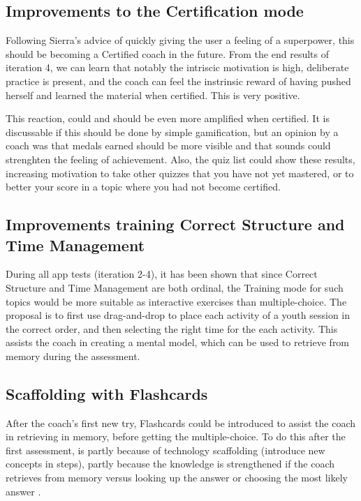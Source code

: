 \subsection{Improvements to the Certification mode}

Following Sierra's advice of quickly giving the user a feeling of a superpower, this should be becoming a Certified coach in the future. From the end results of iteration 4, we can learn that notably the intriscic motivation is high, deliberate practice is present, and the coach can feel the instrinsic reward of having pushed herself and learned the material when certified. This is very positive.

This reaction, could and should be even more amplified when certified. It is discussable if this should be done by simple gamification, but an opinion by a coach was that medals earned should be more visible and that sounds could strenghten the feeling of achievement. Also, the quiz list could show these results, increasing motivation to take other quizzes that you have not yet mastered, or to better your score in a topic where you had not become certified.

\subsection{Improvements training Correct Structure and Time Management}
During all app tests (iteration 2-4), it has been shown that since Correct Structure and Time Management are both ordinal, the Training mode for such topics would be more suitable as interactive exercises than multiple-choice. The proposal is to first use drag-and-drop to place each activity of a youth session in the correct order, and then selecting the right time for the each activity. This assists the coach in creating a mental model, which can be used to retrieve from memory during the assessment.

\subsection{Scaffolding with Flashcards}
After the coach's first new try, Flashcards could be introduced to assist the coach in retrieving in memory, before getting the multiple-choice. To do this after the first assessment, is partly because of technology scaffolding (introduce new concepts in steps), partly because the knowledge is strengthened if the coach retrieves from memory versus looking up the answer or choosing the most likely answer \cite{bjork}.

